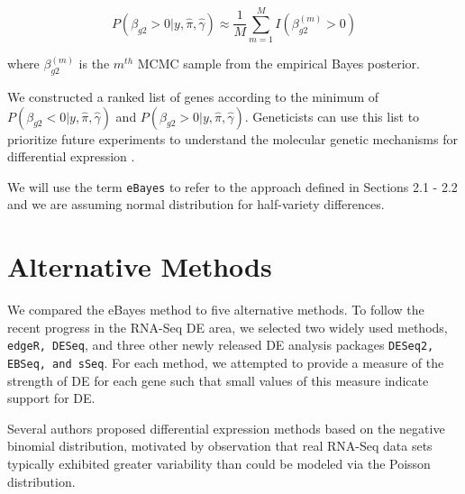 $$P(\beta_{g2}> 0 | y, \hat{\pi}, \hat{\gamma}) \approx \frac{1}{M} \sum_{m=1}^M I(\beta_{g2} ^ {(m)} > 0) $$

where $\beta_{g2}^{(m)}$ is the $m^{th}$ MCMC sample from the empirical Bayes posterior.



We constructed a ranked list of genes according to the minimum of $P(\beta_{g2}< 0 | y, \hat{\pi}, \hat{\gamma})$ and $P(\beta_{g2}> 0 | y, \hat{\pi}, \hat{\gamma})$. Geneticists can use this list to prioritize future experiments to understand the molecular genetic mechanisms for differential expression \citep{niemi2015empirical}. 

We will use the term {\tt eBayes} to refer to the approach defined in Sections 2.1 - 2.2 and we are assuming normal distribution for half-variety differences.

\section{Alternative Methods}

We compared the eBayes method to five alternative methods. To follow the recent progress in the RNA-Seq DE area, we selected two widely used methods, {\tt edgeR, DESeq}, and three other newly released DE analysis packages {\tt DESeq2, EBSeq, and sSeq}. For each method, we attempted to provide a measure of the strength of DE for each gene such that small values of this measure indicate support for DE. 

Several authors proposed differential expression methods based on the negative binomial distribution, motivated by observation that real RNA-Seq data sets typically exhibited greater variability than could be modeled via the Poisson distribution\citep{lorenz2014using}. 

